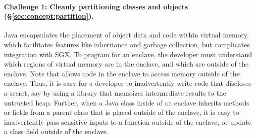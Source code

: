 




\paragraph{\bf Challenge 1: Cleanly partitioning classes and objects (\S\ref{sec:concept:partition}).}
Java encapsulates the placement of object data and code within virtual memory, which facilitates features
like inheritance and garbage collection, but complicates integration with SGX.
To program for an \sgx{} enclave, the developer must understand which regions of virtual memory 
are in the enclave, and which are outside of the enclave.
Note that \sgx{} allows code in the enclave to access memory
outside of the enclave.  Thus, it is easy for a developer to inadvertently write
code that discloses a secret, say by using a library that memoizes intermediate results to the untrusted heap.
Further, when a Java class inside of an enclave inherits methods or fields
from a parent class that is placed outside of the enclave, it is easy to 
inadvertently pass sensitive inputs to a function outside of the enclave,
or update a class field outside of the enclave.

